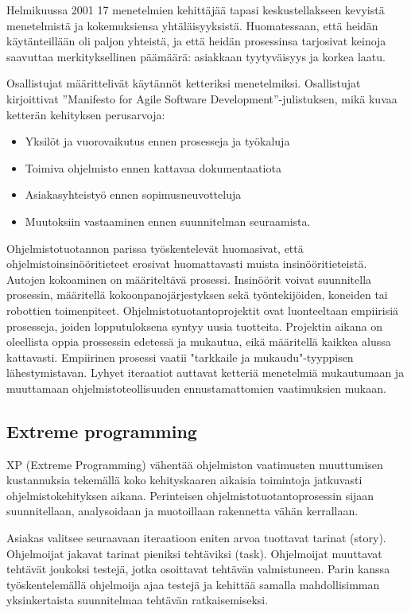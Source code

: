 \documentclass[finnish]{tktltiki2}
\theoremstyle{definition}
\theoremstyle{remark}
\begin{document}
Helmikuussa 2001 17 menetelmien kehittäjää tapasi keskustellakseen kevyistä menetelmistä ja kokemuksiensa yhtäläisyyksistä. Huomatessaan, että heidän käytänteillään oli paljon yhteistä, ja että heidän prosessinsa tarjosivat keinoja saavuttaa merkityksellinen päämäärä: asiakkaan tyytyväisyys ja korkea laatu\cite{WIC03}. 

Osallistujat määrittelivät käytännöt ketteriksi menetelmiksi.
Osallistujat kirjoittivat ''Manifesto for Agile Software Development''-julistuksen, mikä kuvaa ketterän kehityksen perusarvoja:

\begin{itemize}
 \item Yksilöt ja vuorovaikutus ennen prosesseja ja työkaluja
 \item Toimiva ohjelmisto ennen kattavaa dokumentaatiota
 \item Asiakasyhteistyö ennen sopimusneuvotteluja
 \item Muutoksiin vastaaminen ennen suunnitelman seuraamista\cite{WIC03}.
\end{itemize}

Ohjelmistotuotannon parissa työskentelevät huomasivat, että ohjelmistoinsinööritieteet erosivat huomattavasti muista insinööritieteistä. Autojen kokoaminen on määriteltävä prosessi. Insinöörit voivat suunnitella prosessin, määritellä kokoonpanojärjestyksen sekä työntekijöiden, koneiden tai robottien toimenpiteet\cite{WIC03}. Ohjelmistotuotantoprojektit ovat luonteeltaan empiirisiä prosesseja, joiden lopputuloksena syntyy uusia tuotteita. Projektin aikana on oleellista oppia prossessin edetessä ja mukautua, eikä määritellä kaikkea alussa kattavasti. Empiirinen prosessi vaatii "tarkkaile ja mukaudu"-tyyppisen lähestymistavan. Lyhyet iteraatiot auttavat ketteriä menetelmiä mukautumaan ja muuttamaan ohjelmistoteollisuuden ennustamattomien vaatimuksien mukaan\cite{WIC03}.

\subsection{Extreme programming}

XP (Extreme Programming) vähentää ohjelmiston vaatimusten muuttumisen kustannuksia tekemällä koko kehityskaaren aikaisia toimintoja jatkuvasti ohjelmistokehityksen aikana. Perinteisen ohjelmistotuotantoprosessin sijaan suunnitellaan, analysoidaan ja muotoillaan rakennetta vähän kerrallaan\cite{BEC99}.

Asiakas valitsee seuraavaan iteraatioon eniten arvoa tuottavat tarinat (story). Ohjelmoijat jakavat tarinat pieniksi tehtäviksi (task). Ohjelmoijat muuttavat tehtävät joukoksi testejä, jotka osoittavat tehtävän valmistuneen. Parin kanssa työskentelemällä ohjelmoija ajaa testejä ja kehittää samalla mahdollisimman yksinkertaista suunnitelmaa tehtävän ratkaisemiseksi\cite{BEC99}.
\end{document}
